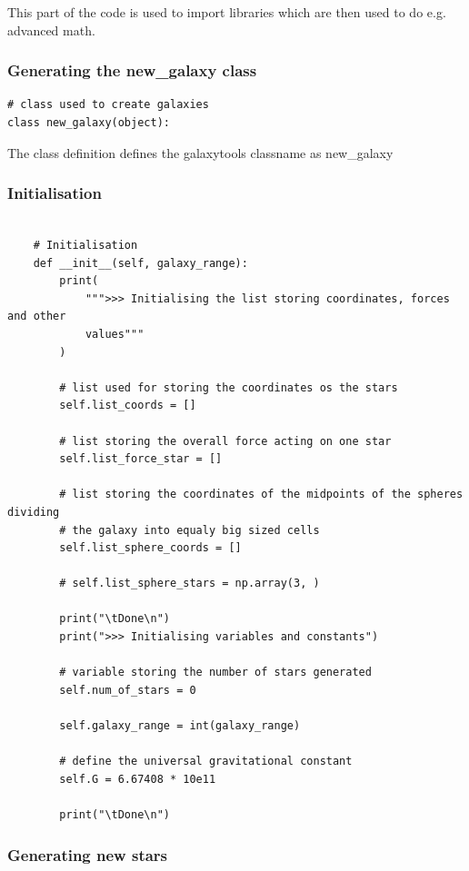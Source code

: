 This part of the code is used to import libraries which are then used to do
e.g. advanced math.

\subsubsection{Generating the new\_galaxy class}

\begin{lstlisting}
# class used to create galaxies
class new_galaxy(object):
\end{lstlisting}

The class definition defines the galaxytools classname as new\_galaxy

\subsubsection{Initialisation}

\begin{lstlisting}

    # Initialisation
    def __init__(self, galaxy_range):
        print(
            """>>> Initialising the list storing coordinates, forces and other
            values"""
        )

        # list used for storing the coordinates os the stars
        self.list_coords = []

        # list storing the overall force acting on one star
        self.list_force_star = []

        # list storing the coordinates of the midpoints of the spheres dividing
        # the galaxy into equaly big sized cells
        self.list_sphere_coords = []

        # self.list_sphere_stars = np.array(3, )

        print("\tDone\n")
        print(">>> Initialising variables and constants")

        # variable storing the number of stars generated
        self.num_of_stars = 0

        self.galaxy_range = int(galaxy_range)

        # define the universal gravitational constant
        self.G = 6.67408 * 10e11

        print("\tDone\n")

\end{lstlisting}

\subsubsection{Generating new stars}

